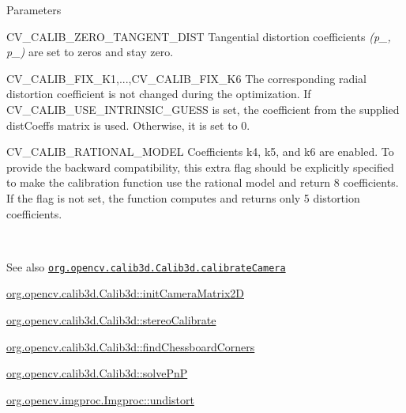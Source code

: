 {\begin{DoxyParams}{Parameters}
\begin{DoxyItemize}
\item C\+V\+\_\+\+C\+A\+L\+I\+B\+\_\+\+Z\+E\+R\+O\+\_\+\+T\+A\+N\+G\+E\+N\+T\+\_\+\+D\+I\+ST Tangential distortion coefficients {\itshape (p\+\_, p\+\_)} are set to zeros and stay zero. 
\item C\+V\+\_\+\+C\+A\+L\+I\+B\+\_\+\+F\+I\+X\+\_\+\+K1,...,C\+V\+\_\+\+C\+A\+L\+I\+B\+\_\+\+F\+I\+X\+\_\+\+K6 The corresponding radial distortion coefficient is not changed during the optimization. If {\ttfamily C\+V\+\_\+\+C\+A\+L\+I\+B\+\_\+\+U\+S\+E\+\_\+\+I\+N\+T\+R\+I\+N\+S\+I\+C\+\_\+\+G\+U\+E\+SS} is set, the coefficient from the supplied {\ttfamily dist\+Coeffs} matrix is used. Otherwise, it is set to 0. 
\item C\+V\+\_\+\+C\+A\+L\+I\+B\+\_\+\+R\+A\+T\+I\+O\+N\+A\+L\+\_\+\+M\+O\+D\+EL Coefficients k4, k5, and k6 are enabled. To provide the backward compatibility, this extra flag should be explicitly specified to make the calibration function use the rational model and return 8 coefficients. If the flag is not set, the function computes and returns only 5 distortion coefficients. 
\end{DoxyItemize}\\
\hline
\end{DoxyParams}
\begin{DoxySeeAlso}{See also}
\href{http://docs.opencv.org/modules/calib3d/doc/camera_calibration_and_3d_reconstruction.html#calibratecamera}{\tt org.\+opencv.\+calib3d.\+Calib3d.\+calibrate\+Camera} 

\mbox{\hyperlink{classorg_1_1opencv_1_1calib3d_1_1_calib3d_a15df47d3a4b4a3ef48f13d1c09aae9cb}{org.\+opencv.\+calib3d.\+Calib3d\+::init\+Camera\+Matrix2D}} 

\mbox{\hyperlink{classorg_1_1opencv_1_1calib3d_1_1_calib3d_af2197ce033076b13fef5ae2fc045aa62}{org.\+opencv.\+calib3d.\+Calib3d\+::stereo\+Calibrate}} 

\mbox{\hyperlink{classorg_1_1opencv_1_1calib3d_1_1_calib3d_a5a4ea03ae303cf3c5a327ec5c85047a5}{org.\+opencv.\+calib3d.\+Calib3d\+::find\+Chessboard\+Corners}} 

\mbox{\hyperlink{classorg_1_1opencv_1_1calib3d_1_1_calib3d_ad53b5772231896ec5baf3bde5e9ba319}{org.\+opencv.\+calib3d.\+Calib3d\+::solve\+PnP}} 

\mbox{\hyperlink{classorg_1_1opencv_1_1imgproc_1_1_imgproc_a0733bf11be8125dfc28b6ff4da746927}{org.\+opencv.\+imgproc.\+Imgproc\+::undistort}} 
\end{DoxySeeAlso}
}\mbox{\label{classorg_1_1opencv_1_1calib3d_1_1_calib3d_aaa55919083e3f9e4d55ad80fac0d156d}} 
